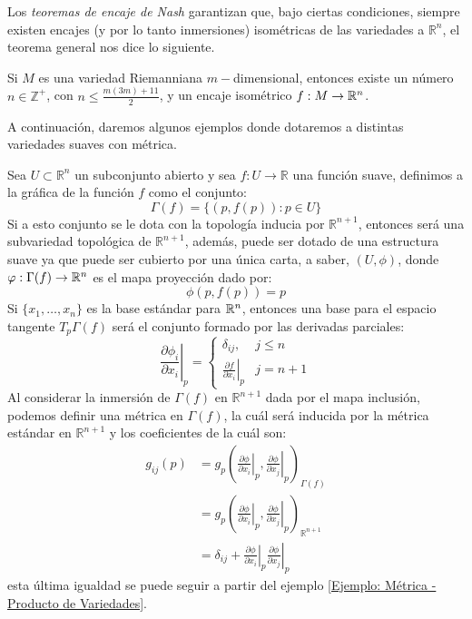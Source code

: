 Los \textit{teoremas de encaje de Nash} garantizan que, bajo ciertas condiciones, siempre existen encajes (y por lo tanto inmersiones) isométricas de las variedades a $\mathbb{R}^{n}$, el teorema general nos dice lo siguiente.

\begin{theorem}
	Si $M$ es una variedad Riemanniana $m-$dimensional, entonces existe un número $n \in \mathbb{Z}^{+}$, con $n \leq \frac{m(3m)+11}{2}$, y un encaje isométrico $f: M \to \mathbb{R}^{n}$.
\end{theorem}

A continuación, daremos algunos ejemplos donde dotaremos a distintas variedades suaves con métrica.

\begin{example}\label{Ejemplo: Métrica - Gráfica de funciones suaves}
	Sea $U \subset \mathbb{R}^{n}$ un subconjunto abierto y sea $f: U \to \mathbb{R}$ una función suave, definimos a la gráfica de la función $f$ como el conjunto:
	\[
		\Gamma(f) = \{(p,f(p)): p \in U\}
	\]
	Si a esto conjunto se le dota con la topología inducia por $\mathbb{R}^{n+1}$, entonces será una subvariedad topológica de $\mathbb{R}^{n+1}$, además, puede ser dotado de una estructura suave ya que puede ser cubierto por una única carta, a saber, $(U,\phi)$,  donde $\varphi: \Gamma(f) \to \mathbb{R}^{n}$ es el mapa proyección dado por:
	\[
		\phi(p,f(p)) = p
	\]
	Si $\{x_{1},\ldots,x_{n}\}$ es la base estándar para $\mathbb{R}^{n}$, entonces una base para el espacio tangente $T_{p}\Gamma(f)$ será el conjunto formado por las derivadas parciales:
	\[
		\left. \frac{\partial \phi_i}{\partial x_i} \right|_{p} =
		\begin{cases}
			\delta_{ij},                                     & j \leq n \\
			\left. \frac{\partial f}{\partial x_i} \right|_p & j=n+1
		\end{cases}
	\]
	Al considerar la inmersión de $\Gamma(f)$ en $\mathbb{R}^{n+1}$ dada por el mapa inclusión, podemos definir una métrica en $\Gamma(f)$, la cuál será inducida por la métrica estándar en $\mathbb{R}^{n+1}$ y los coeficientes de la cuál son:
	\begin{align*}
		g_{ij}(p) & = g_{p} \left(
		\left. \frac{\partial \phi}{\partial x_{i}}\right|_{p},
		\left. \frac{\partial \phi}{\partial x_{j}}\right|_{p}
		\right)_{\Gamma(f)}         \\
		          & = g_{p} \left(
		\left. \frac{\partial \phi}{\partial x_{i}}\right|_{p},
		\left. \frac{\partial \phi}{\partial x_{j}}\right|_{p}
		\right)_{\mathbb{R}^{n+1}}  \\
		          & = \delta_{ij} +
		\left. \frac{\partial \phi}{\partial x_{i}}\right|_{p}
		\left. \frac{\partial \phi}{\partial x_{j}}\right|_{p}
	\end{align*}
	esta última igualdad se puede seguir a partir del ejemplo \ref{Ejemplo: Métrica - Producto de Variedades}.
\end{example}

